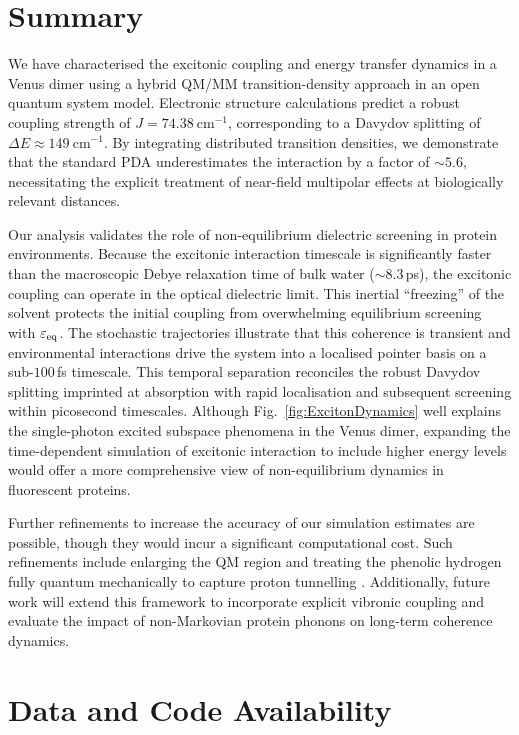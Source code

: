 \documentclass[journal=jpclcd, manuscript=letter, layout=twocolumn, doi=true]{achemso}
\begin{document}
\section{Summary}

We have characterised the excitonic coupling and energy transfer dynamics in a Venus dimer using a hybrid QM/MM transition-density approach in an open quantum system model. Electronic structure calculations predict a robust coupling strength of $J = 74.38~\mathrm{cm^{-1}}$, corresponding to a Davydov splitting of $\Delta E \approx 149~\mathrm{cm^{-1}}$. By integrating distributed transition densities, we demonstrate that the standard PDA underestimates the interaction by a factor of $\sim 5.6$, necessitating the explicit treatment of near-field multipolar effects at biologically relevant distances.

Our analysis validates the role of non-equilibrium dielectric screening in protein environments. Because the excitonic interaction timescale is significantly faster than the macroscopic Debye relaxation time of bulk water ($\sim 8.3$\,ps), the excitonic coupling can operate in the optical dielectric limit. This inertial ``freezing'' of the solvent protects the initial coupling from overwhelming equilibrium screening with $\varepsilon_{\rm eq}$. The stochastic trajectories illustrate that this coherence is transient and environmental interactions drive the system into a localised pointer basis on a sub-$100$\,fs timescale. This temporal separation reconciles the robust Davydov splitting imprinted at absorption with rapid localisation and subsequent screening within picosecond timescales. Although Fig.~\ref{fig:ExcitonDynamics} well explains the single-photon excited subspace phenomena in the Venus dimer, expanding the time-dependent simulation of excitonic interaction to include higher energy levels would offer a more comprehensive view of non-equilibrium dynamics in fluorescent proteins.

Further refinements to increase the accuracy of our simulation estimates are possible, though they would incur a significant computational cost. Such refinements include enlarging the QM region and treating the phenolic hydrogen fully quantum mechanically to capture proton tunnelling \cite{chakraborty2008development,bourne2024quantum}. Additionally, future work will extend this framework to incorporate explicit vibronic coupling and evaluate the impact of non-Markovian protein phonons on long-term coherence dynamics.

\section{Data and Code Availability}
\end{document}
